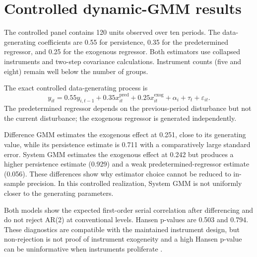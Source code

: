\documentclass[article]{jss}
\begin{document}
\begin{table}[t!]
\centering
\small
\setlength{\tabcolsep}{4.5pt}
\renewcommand{\arraystretch}{1.16}

\caption{\label{tab:holdout} Late-cycle holdout performance. Source: Author's computation from the nested cycle-ordered validation (Artifacts 04, 06, and 07). Notes: The forest is selected only within cycles 1--70 using expanding windows. The final cycles 71--100 are evaluated once; neither model uses lagged risk, lagged RUL, or cycle.}
\end{table}


\FloatBarrier

\section{Controlled dynamic-GMM results}
The controlled panel contains 120 units observed over ten periods. The data-generating coefficients are 0.55
for persistence, 0.35 for the predetermined regressor, and 0.25 for the exogenous regressor. Both estimators use
collapsed instruments and two-step covariance calculations. Instrument counts (five and eight) remain well
below the number of groups.

The exact controlled data-generating process is
\begin{equation}
\label{eq:controlled-dgp}
y_{it}
= 0.55y_{i,t-1} + 0.35x_{it}^{\mathrm{pred}}
+ 0.25x_{it}^{\mathrm{exog}}
+ \alpha_i + \tau_t + \varepsilon_{it}.
\end{equation}
The predetermined regressor depends on the previous-period disturbance but not the
current disturbance; the exogenous regressor is generated independently.

Difference GMM estimates the exogenous effect at 0.251, close to its generating value, while its persistence
estimate is 0.711 with a comparatively large standard error. System GMM estimates the exogenous effect at 0.242
but produces a higher persistence estimate (0.929) and a weak predetermined-regressor estimate (0.056). These
differences show why estimator choice cannot be reduced to in-sample precision. In this controlled realization,
System GMM is not uniformly closer to the generating parameters.

Both models show the expected first-order serial correlation after differencing and do not reject AR(2) at
conventional levels. Hansen p-values are 0.503 and 0.794. These diagnostics are compatible with the maintained
instrument design, but non-rejection is not proof of instrument exogeneity and a high Hansen p-value can be
uninformative when instruments proliferate \citep{roodman2009xtabond2}.
\end{document}
